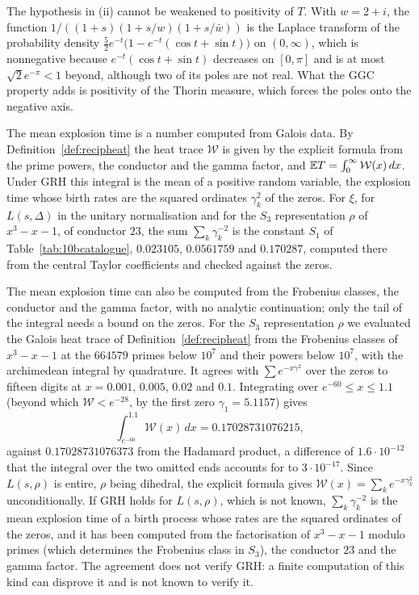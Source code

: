 The hypothesis in (ii) cannot be weakened to positivity of $T$. With $w=2+i$, the function $1/((1+s)(1+s/w)(1+s/\bar w))$ is the Laplace transform of the probability density $\frac52e^{-t}\bigl(1-e^{-t}(\cos t+\sin t)\bigr)$ on $(0,\infty)$, which is nonnegative because $e^{-t}(\cos t+\sin t)$ decreases on $[0,\pi]$ and is at most $\sqrt2e^{-\pi}<1$ beyond, although two of its poles are not real. What the GGC property adds is positivity of the Thorin measure, which forces the poles onto the negative axis.

The mean explosion time is a number computed from Galois data. By Definition~\ref{def:recipheat} the heat trace $\mathcal W$ is given by the explicit formula from the prime powers, the conductor and the gamma factor, and $\mathbb{E} T=\int_0^\infty\mathcal W(x)\,dx$. Under GRH this integral is the mean of a positive random variable, the explosion time whose birth rates are the squared ordinates $\gamma_k^2$ of the zeros. For $\xi$, for $L(s,\Delta)$ in the unitary normalisation and for the $S_3$ representation $\rho$ of $x^3-x-1$, of conductor $23$, the sum $\sum_k\gamma_k^{-2}$ is the constant $S_1$ of Table~\ref{tab:10bcatalogue}, $0.023105$, $0.0561759$ and $0.170287$, computed there from the central Taylor coefficients and checked against the zeros.

The mean explosion time can also be computed from the Frobenius classes, the conductor and the gamma factor, with no analytic continuation; only the tail of the integral needs a bound on the zeros. For the $S_3$ representation $\rho$ we evaluated the Galois heat trace of Definition~\ref{def:recipheat} from the Frobenius classes of $x^3-x-1$ at the $664579$ primes below $10^7$ and their powers below $10^7$, with the archimedean integral by quadrature. It agrees with $\sum e^{-x\gamma^2}$ over the zeros to fifteen digits at $x=0.001$, $0.005$, $0.02$ and $0.1$. Integrating over $e^{-60}\le x\le1.1$ (beyond which $\mathcal W<e^{-28}$, by the first zero $\gamma_1=5.1157$) gives
\[
\int_{e^{-60}}^{1.1}\mathcal W(x)\,dx=0.17028731076215,
\]
against $0.17028731076373$ from the Hadamard product, a difference of $1.6\cdot10^{-12}$ that the integral over the two omitted ends accounts for to $3\cdot10^{-17}$. Since $L(s,\rho)$ is entire, $\rho$ being dihedral, the explicit formula gives $\mathcal W(x)=\sum_ke^{-x\gamma_k^2}$ unconditionally. If GRH holds for $L(s,\rho)$, which is not known, $\sum_k\gamma_k^{-2}$ is the mean explosion time of a birth process whose rates are the squared ordinates of the zeros, and it has been computed from the factorisation of $x^3-x-1$ modulo primes (which determines the Frobenius class in $S_3$), the conductor $23$ and the gamma factor. The agreement does not verify GRH: a finite computation of this kind can disprove it and is not known to verify it.

